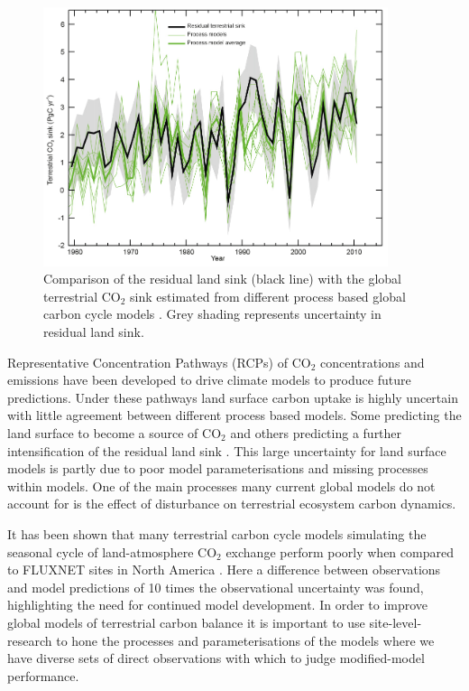 \documentclass[12pt]{article}
\begin{document}
\begin{figure}[ht]
    \centering
    \includegraphics[width=0.9\textwidth]{ipcc_fig6_16.jpg}
    \caption{Comparison of the residual land sink (black line) with the global terrestrial CO\(_{2}\) sink estimated from different process based global carbon cycle models \citep{ciais2014carbon}. Grey shading represents uncertainty in residual land sink.}
    \label{fig:ipcc_fig6.16}
\end{figure}

Representative Concentration Pathways (RCPs) of CO\(_{2}\) concentrations and emissions have been developed \citep{moss2010next} to drive climate models to produce future predictions. Under these pathways land surface carbon uptake is highly uncertain with little agreement between different process based models. Some predicting the land surface to become a source of CO\(_{2}\) and others predicting a further intensification of the residual land sink \citep{jones2013twenty}. This large uncertainty for land surface models is partly due to poor model parameterisations and missing processes within models. One of the main processes many current global models do not account for is the effect of disturbance on terrestrial ecosystem carbon dynamics.

It has been shown that many terrestrial carbon cycle models simulating the seasonal cycle of land-atmosphere CO\(_{2}\) exchange perform poorly when compared to FLUXNET sites in North America \citep{schwalm2010model}. Here a difference between observations and model predictions of 10 times the observational uncertainty was found, highlighting the need for continued model development. In order to improve global models of terrestrial carbon balance it is important to use site-level-research to hone the processes and parameterisations of the models where we have diverse sets of direct observations with which to judge modified-model performance. 
\end{document}
